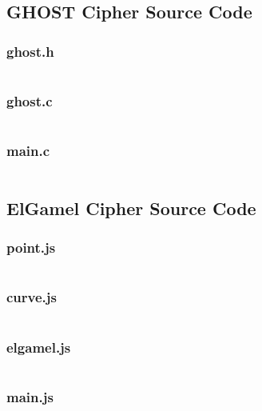 \documentclass[12pt, a4paper, final]{report}
\begin{document}
\subsection*{GHOST Cipher Source Code}
\subsubsection*{ghost.h}
\inputminted[fontsize=\scriptsize]{c}{code/ghost.h}
\subsubsection*{ghost.c}
\inputminted[fontsize=\scriptsize]{c}{code/ghost.c}
\subsubsection*{main.c}
\inputminted[fontsize=\scriptsize]{c}{code/main.c}

\subsection*{ElGamel Cipher Source Code}
\subsubsection*{point.js}
\inputminted[fontsize=\scriptsize]{javascript}{code/point.js}
\subsubsection*{curve.js}
\inputminted[fontsize=\scriptsize]{javascript}{code/curve.js}
\subsubsection*{elgamel.js}
\inputminted[fontsize=\scriptsize]{javascript}{code/elgamel.js}
\subsubsection*{main.js}
\inputminted[fontsize=\scriptsize]{javascript}{code/main.js}
\end{document}
